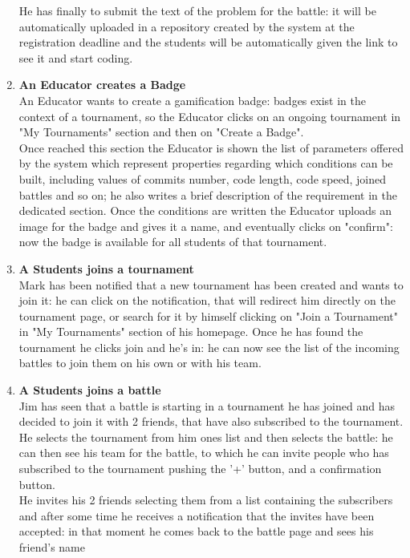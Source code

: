 \documentclass{article}
\begin{document}
\begin{enumerate}
\begin{itemize}
  \end{itemize}
  He has finally to submit the text of the problem for the battle: it will be automatically uploaded in a repository created by the system at the registration
  deadline and the students will be automatically given the link to see it and start coding.\\
  \newpage
  \item \textbf{An Educator creates a Badge\\}An Educator wants to create a gamification badge: badges exist in the context of a tournament, so the Educator clicks on an ongoing tournament
  in "My Tournaments" section and then on "Create a Badge".\\
  Once reached this section the Educator is shown the list of parameters offered by the system which represent properties regarding which conditions can be built, including values of commits number, code length, code speed, joined battles
  and so on; he also writes a brief description of the requirement in the dedicated section.
  Once the conditions are written the Educator uploads an image for the badge and gives it a name, and eventually clicks on "confirm": now the badge is available for all students of that tournament.\\
  \item \textbf{A Students joins a tournament\\} Mark has been notified that a new tournament has been created and wants to join it: he can click on the notification, that will redirect him directly on the tournament page, or search for it by himself clicking on "Join a Tournament" in "My Tournaments"
  section of his homepage. 
  Once he has found the tournament he clicks join and he's in: he can now see the list of the incoming battles to join them on his own or with his team.\\
  \item \textbf{A Students joins a battle\\} Jim has seen that a battle is starting in a tournament he has joined and has decided to join it with 2 friends, that have also subscribed to the tournament.\\
  He selects the tournament from him ones list and then selects the battle: he can then see his team for the battle, to which he can invite people who has subscribed to the tournament pushing the '+' button, and a confirmation button.\\
  He invites his 2 friends selecting them from a list containing the subscribers and after some time he receives a notification that the invites have been accepted: in that moment he comes back to the battle page and sees his friend's name 

\end{enumerate}
\end{document}
